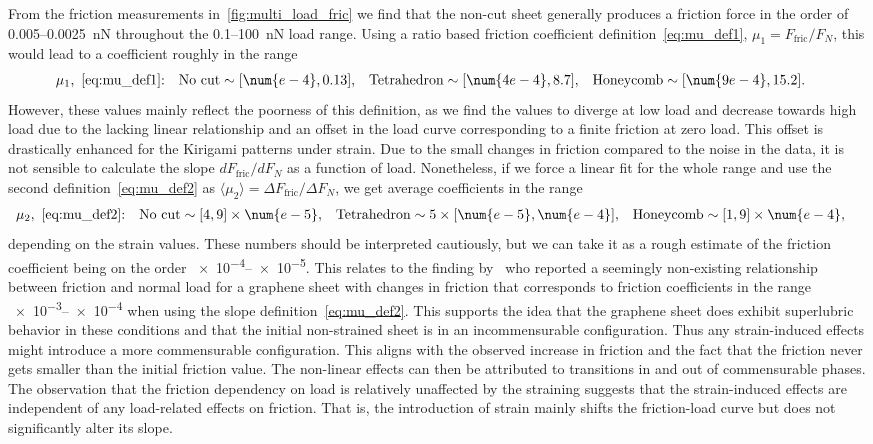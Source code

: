 From the friction measurements in~\cref{fig:multi_load_fric} we find that the
non-cut sheet generally produces a friction force in the order of 0.005--\SI{0.0025}{nN} throughout the 0.1--\SI{100}{nN} load range. Using a ratio based friction coefficient definition~\cref{eq:mu_def1}, $\mu_1 = F_{\text{fric}}/{F_N}$, this would lead to a coefficient roughly in the range
\begin{align*}
  &\mu_1,  \ \text{\cref{eq:mu_def1}:}& &\text{No cut}\sim [\num{e-4}, 0.13],&  &\text{Tetrahedron}\sim [\num{4e-4},8.7],& &\text{Honeycomb}\sim [\num{9e-4}, 15.2].&
\end{align*}
However, these values mainly reflect the poorness of this definition, as we find the values to diverge at low load and decrease towards high load due to the lacking linear relationship and an offset in the load curve corresponding to a finite friction at zero load. This offset is drastically enhanced for the Kirigami patterns under strain. Due to the small changes in friction compared to the noise in the data, it is not sensible to calculate the slope $dF_{\text{fric}}/dF_N$ as a function of load. Nonetheless, if we force a linear fit for the whole range and use the second definition~\cref{eq:mu_def2} as $\langle \mu_2 \rangle = \Delta F_{\text{fric}}/\Delta F_N$, we get average coefficients in the range
\begin{align*}
  &\mu_2,  \ \text{\cref{eq:mu_def2}:}& &\text{No cut} \sim [4, 9]\times \num{e-5},&  &\text{Tetrahedron} \sim 5\times[\num{e-5}, \num{e-4}],& &\text{Honeycomb} \sim [1,9]\times \num{e-4},&
\end{align*}
depending on the strain values. These numbers should be interpreted cautiously,
but we can take it as a rough estimate of the friction coefficient being on the
order \num{e-4}--\num{e-5}. This relates to the finding
by~\cite{DIENWIEBEL2005197} who reported a seemingly non-existing relationship
between friction and normal load for a graphene sheet with changes in friction
that corresponds to friction coefficients in the range \num{e-3}--\num{e-4} when
using the slope definition~\cref{eq:mu_def2}. This supports the idea that the
graphene sheet does exhibit superlubric behavior in these conditions and that the initial non-strained sheet is in an incommensurable
configuration. Thus any strain-induced effects might introduce a more
commensurable configuration. This aligns with the observed increase in friction
and the fact that the friction never gets smaller than the initial friction
value. The non-linear effects can then be attributed to transitions in and out
of commensurable phases. The observation that the friction dependency on load is
relatively unaffected by the straining suggests that the strain-induced effects
are independent of any load-related effects on friction. That is, the
introduction of strain mainly shifts the friction-load curve but does not
significantly alter its slope. 
\vspace{5cm}

